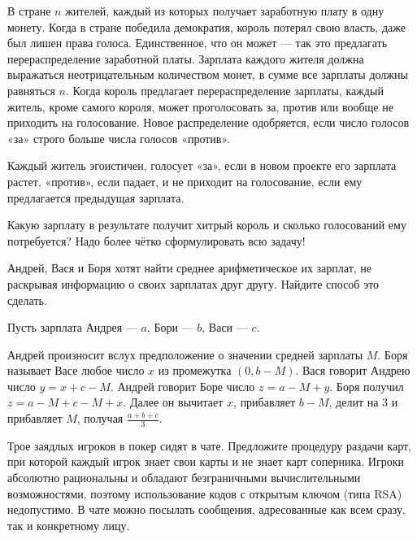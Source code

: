\begin{problem}
В стране  $n$  жителей, каждый из которых получает заработную плату в одну монету. Когда в стране победила демократия, король потерял свою власть, даже был лишен права голоса. Единственное, что он может — так это предлагать перераспределение заработной платы. Зарплата каждого жителя должна выражаться неотрицательным количеством монет, в сумме все зарплаты должны равняться  $n$. Когда король предлагает перераспределение зарплаты, каждый житель, кроме самого короля, может проголосовать за, против или вообще не приходить на голосование. Новое распределение одобряется, если число голосов «за» строго больше числа голосов «против».\par
Каждый житель эгоистичен, голосует «за», если в новом проекте его зарплата растет, «против», если падает, и не приходит на голосование, если ему предлагается предыдущая зарплата.\par
Какую зарплату в результате получит хитрый король и сколько голосований ему потребуется?
{\red Надо более чётко сформулировать всю задачу!}



\begin{sol}

\end{sol}
\end{problem}



\begin{problem}
 Андрей, Вася и Боря хотят найти среднее арифметическое их зарплат, не раскрывая информацию о своих зарплатах друг другу. Найдите способ это сделать.



\begin{sol}

Пусть зарплата Андрея — $a$, Бори — $b$, Васи — $c$.

Андрей произносит вслух предположение о значении средней зарплаты $M$.
Боря называет Васе любое число $x$ из промежутка $(0, b-M)$. Вася говорит Андрею число $y=x+c-M$. Андрей говорит Боре число $z= a-M+y$. Боря получил $z = a-M+c-M+x$. Далее он вычитает $x$, прибавляет $b-M$, делит на 3 и прибавляет $M$, получая $\frac{a+b+c}{3}$.
\end{sol}
\end{problem}



\begin{problem}
Трое заядлых игроков в покер сидят в чате. Предложите процедуру раздачи карт, при которой каждый игрок знает свои карты и не знает карт соперника. Игроки абсолютно рациональны и обладают безграничными вычислительными возможностями, поэтому использование кодов с открытым ключом (типа RSA) недопустимо. В чате можно посылать сообщения, адресованные как всем сразу, так и конкретному лицу.\par



\begin{sol}

\end{sol}
\end{problem}




